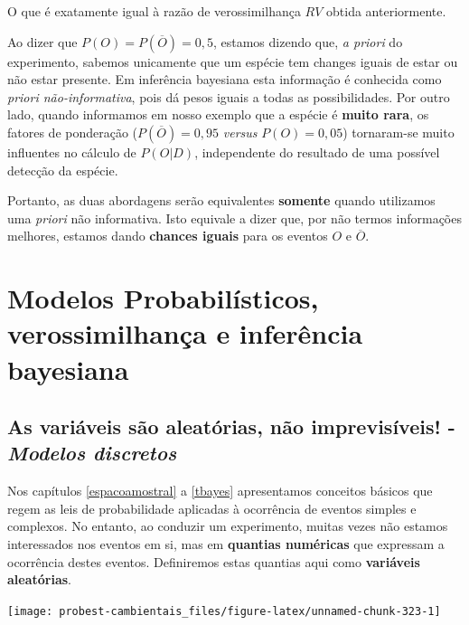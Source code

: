 \documentclass[
]{book}
\begin{document}
O que é exatamente igual à razão de verossimilhança \(RV\) obtida anteriormente.

Ao dizer que \(P(O) = P(\overline{O}) = 0,5\), estamos dizendo que, \emph{a priori} do experimento, sabemos unicamente que um espécie tem changes iguais de estar ou não estar presente. Em inferência bayesiana esta informação é conhecida como \emph{priori não-informativa}, pois dá pesos iguais a todas as possibilidades. Por outro lado, quando informamos em nosso exemplo que a espécie é \textbf{muito rara}, os fatores de ponderação (\(P(\overline{O}) = 0,95\) \emph{versus} \(P(O) = 0,05\)) tornaram-se muito influentes no cálculo de \(P(O|D)\), independente do resultado de uma possível detecção da espécie.

Portanto, as duas abordagens serão equivalentes \textbf{somente} quando utilizamos uma \emph{priori} não informativa. Isto equivale a dizer que, por não termos informações melhores, estamos dando \textbf{chances iguais} para os eventos \(O\) e \(\overline{O}\).

\hypertarget{part-modelos-probabiluxedsticos-verossimilhanuxe7a-e-inferuxeancia-bayesiana}{%
\part{Modelos Probabilísticos, verossimilhança e inferência bayesiana}\label{part-modelos-probabiluxedsticos-verossimilhanuxe7a-e-inferuxeancia-bayesiana}}

\hypertarget{va}{%
\chapter{\texorpdfstring{As variáveis são aleatórias, não imprevisíveis! - \emph{Modelos discretos}}{As variáveis são aleatórias, não imprevisíveis! - Modelos discretos}}\label{va}}

Nos capítulos \ref{espacoamostral} a \ref{tbayes} apresentamos conceitos básicos que regem as leis de probabilidade aplicadas à ocorrência de eventos simples e complexos. No entanto, ao conduzir um experimento, muitas vezes não estamos interessados nos eventos em si, mas em \textbf{quantias numéricas} que expressam a ocorrência destes eventos. Definiremos estas quantias aqui como \textbf{variáveis aleatórias}.

\begin{center}\texttt{[image: probest-cambientais\_files/figure-latex/unnamed-chunk-323-1]} \end{center}
\end{document}
